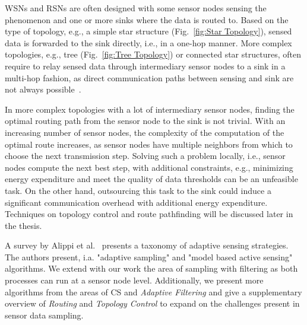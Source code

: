 \par
\acp{WSN} and \acp{RSN} are often designed with some sensor nodes sensing the
phenomenon and one or more sinks where the data is routed to. Based on the type
of topology, e.g., a simple star structure (Fig.~\ref{fig:Star Topology}),
sensed data is forwarded to the sink directly, i.e., in a one-hop manner. More
complex topologies, e.g., tree (Fig.~\ref{fig:Tree Topology}) or connected star
structures, often require to relay sensed data through intermediary sensor
nodes to a sink in a multi-hop fashion, as direct communication paths between
sensing and sink are not always possible~\cite{romer2004design}. 
\par
In more complex topologies with a lot of intermediary sensor nodes, finding the
optimal routing path from the sensor node to the sink is not trivial. With an
increasing number of sensor nodes, the complexity of the computation of the
optimal route increases, as sensor nodes have multiple neighbors from which to
choose the next transmission step. Solving such a problem locally, i.e., sensor
nodes compute the next best step, with additional constraints, e.g., minimizing
energy expenditure and meet the quality of data thresholds can be an unfeasible
task. On the other hand, outsourcing this task to the sink could induce a
significant communication overhead with additional energy expenditure.
Techniques on topology control and route pathfinding will be discussed later in
the thesis.
\par
A survey by Alippi et al.~\cite{alippi2009energy} presents a taxonomy of
adaptive sensing strategies. The authors present, i.a. "adaptive sampling" and
"model based active sensing" algorithms. We extend with our work the area of
sampling with filtering as both processes can run at a sensor node level.
Additionally, we present more algorithms from the areas of \ac{CS} and
\textit{Adaptive Filtering} and give a supplementary overview of
\textit{Routing} and \textit{Topology Control} to expand on the challenges
present in sensor data sampling.

